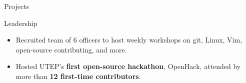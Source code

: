 \documentclass{resume} %
\begin{document}
\begin{workSection}{Projects}
\end{workSection}

\begin{workSection}{Leadership}
    
    \customItem[
    	title=President \& Founder - \href{https://www.instagram.com/foss.utep/}{\textbf{Free and Open Source Software Club at UTEP} \faExternalLink},
    	duration=December 2023 - Present
    ]
    \begin{itemize}
    	\vspace{-0.5em}
    	\itemsep -6pt {}
    	\item Recruited team of 6 officers to host weekly workshops on git, Linux, Vim, open-source contributing, and more.
		\item Hosted UTEP's \textbf{first open-source hackathon}, OpenHack, attended by more than \textbf{12 first-time contributors}.
    \end{itemize}


\end{workSection}
\end{document}
